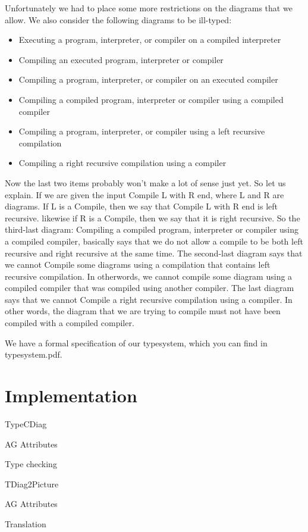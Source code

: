 \documentclass{article}
\begin{document}
Unfortunately we had to place some more restrictions on the diagrams that we allow. We also consider the following diagrams to be ill-typed:

\begin{itemize}
	\item Executing a program, interpreter, or compiler on a compiled interpreter
	\item Compiling an executed program, interpreter or compiler
	\item Compiling a program, interpreter, or compiler on an executed compiler
	\item Compiling a compiled program, interpreter or compiler using a compiled compiler
	\item Compiling a program, interpreter, or compiler using a left recursive compilation
	\item Compiling a right recursive compilation using a compiler
\end{itemize}

Now the last two items probably won't make a lot of sense just yet. So let us explain. If we are given the input Compile L with R end,
where L and R are diagrams. If L is a Compile, then we say that Compile L with R end is left recursive. likewise if R is a Compile, then we say that it is right recursive.
So the third-last diagram: Compiling a compiled program, interpreter or compiler using a compiled compiler, basically says that we do not allow a compile to be both left recursive and right recursive at the same time. The second-last diagram says that we cannot Compile some diagrams using a compilation that contains left recursive compilation. In otherwords, we cannot compile some diagram using a compiled compiler that was compiled using another compiler. The last diagram says that we cannot Compile a right recursive compilation using a compiler.
In other words, the diagram that we are trying to compile must not have been compiled with a compiled compiler.

\hfill \break

We have a formal specification of our typesystem, which you can find in typesystem.pdf.

\section{Implementation}

\begin{subsection}{TypeCDiag}


\begin{subsubsection}{AG Attributes}
\end{subsubsection}

\begin{subsubsection}{Type checking}
\end{subsubsection}
\end{subsection}

\begin{subsection}{TDiag2Picture}
\begin{subsubsection}{AG Attributes}
\end{subsubsection}
\begin{subsubsection}{Translation}
\end{subsubsection}
\end{subsection}
\end{document}
